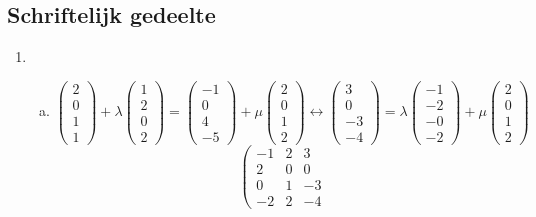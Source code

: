 \documentclass[main.tex]{subfiles}
\begin{document}
\subsection*{Schriftelijk gedeelte}
\begin{enumerate}
\item
  \begin{enumerate}[(a)]
  \item 
    \[
    \begin{pmatrix}
      2\\0\\1\\1
    \end{pmatrix}
    + \lambda
    \begin{pmatrix}
      1\\2\\0\\2
    \end{pmatrix}
    =
    \begin{pmatrix}
      -1\\0\\4\\-5
    \end{pmatrix}
    + \mu
    \begin{pmatrix}
      2\\0\\1\\2
    \end{pmatrix}
    \longleftrightarrow
    \begin{pmatrix}
      3\\0\\-3\\-4
    \end{pmatrix}
    =
    \lambda
    \begin{pmatrix}
      -1\\-2\\-0\\-2
    \end{pmatrix}
    + \mu
    \begin{pmatrix}
      2\\0\\1\\2
    \end{pmatrix}
    \]
    \[
    \left(
      \begin{array}{cc|c}
        -1 & 2 & 3\\
        2 & 0 & 0\\
        0 & 1 & -3\\
        -2 & 2 & -4
      \end{array}
\]
\end{enumerate}
\end{enumerate}
\end{document}
